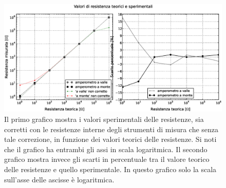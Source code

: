 \begin{figure}[h]
    \centering
        \includegraphics[width=\textwidth]{Res.eps}%
        \caption{Il primo grafico mostra i valori sperimentali delle resistenze, sia corretti con le resistenze interne degli strumenti di misura che senza tale correzione, in funzione dei valori teorici delle resistenze. Si noti che il grafico ha entrambi gli assi in scala logaritmica. Il secondo grafico mostra invece gli scarti in percentuale tra il valore teorico delle resistenze e quello sperimentale. In questo grafico solo la scala sull'asse delle ascisse è logaritmica.}
        \label{fig:resistenze}
\end{figure}

